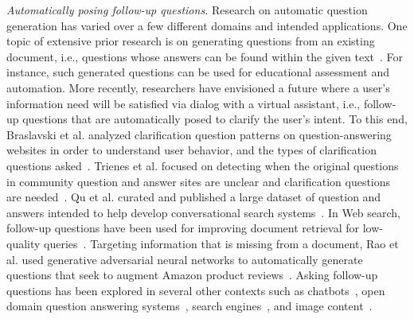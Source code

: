 \noindent
{\em Automatically posing follow-up questions.} Research on automatic question generation has varied over a few different domains and intended applications. One topic of extensive prior research is on generating questions from an existing document, i.e., questions whose answers can be found within the given text~\cite{vanderwende2008importance,rus2011question,zhou2017neural,heilman2010good,duan2017question,du2017learning}. For instance, such generated questions can be used for educational assessment and automation. More recently, researchers have envisioned a future where a user's information need will be satisfied via dialog with a virtual assistant, i.e., follow-up questions that are automatically posed to clarify the user's intent. To this end, Braslavski et al. analyzed clarification question patterns on question-answering websites in order to understand user behavior, and the types of clarification questions asked~\cite{10.1145/3020165.3022149}. Trienes et al. focused on detecting when the original questions in community question and answer sites are unclear and clarification questions are needed~\cite{trienes2019identifying}. Qu et al. curated and published a large dataset of question and answers intended to help develop conversational search systems~\cite{10.1145/3209978.3210124}. In Web search, follow-up questions have been used for improving document retrieval for low-quality queries~\cite{10.1145/3366423.3380126,10.1145/3331184.3331265,stoyanchev2014towards}. Targeting information that is missing from a document, Rao et al. used generative adversarial neural networks to automatically generate questions that seek to augment Amazon product reviews~\cite{rao-daume-iii-2018-learning}. Asking follow-up questions has been explored in several other contexts such as chatbots~\cite{Hancock2019LearningFD}, open domain question answering systems~\cite{de2005implementing, de2003analysis}, search engines~\cite{Ren2020ConversationsWS}, and image content~\cite{Mostafazadeh_2016}.
